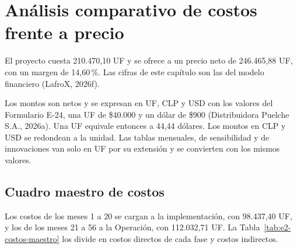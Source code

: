 \section{Análisis comparativo de costos frente a precio}
\label{sec:e2-costos-precio}

El proyecto cuesta 210.470,10 UF y se ofrece a un precio neto de 246.465,88 UF, con un margen de 14,60\,\%. Las cifras de este capítulo son las del modelo financiero (LafroX, 2026f).

Los montos son netos y se expresan en UF, CLP y USD con los valores del Formulario E-24, una UF de \$40.000 y un dólar de \$900 (Distribuidora Puelche S.A., 2026a). Una UF equivale entonces a 44,44 dólares. Los montos en CLP y USD se redondean a la unidad. Las tablas mensuales, de sensibilidad y de innovaciones van solo en UF por su extensión y se convierten con los mismos valores.

\subsection{Cuadro maestro de costos}
\label{sec:e2-cuadro-costos}

Los costos de los meses 1 a 20 se cargan a la implementación, con 98.437,40 UF, y los de los meses 21 a 56 a la Operación, con 112.032,71 UF. La Tabla~\ref{tab:e2-costos-maestro} los divide en costos directos de cada fase y costos indirectos.

